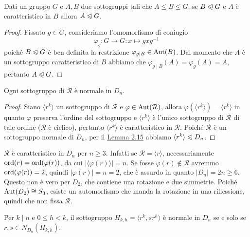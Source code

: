 \documentclass[11pt]{scrartcl}
\begin{document}
\begin{lemma}
    \label{lemma1.0}
    Dati un gruppo $G$ e $A, B$ due sottogruppi tali che $A \leqslant B \leqslant G$,
    se $B\trianglelefteqslant G$ e $A$ è caratteristico in $B$ allora 
    $A \trianglelefteqslant G$.
\end{lemma}

\begin{proof}
    Fissato $g \in G$, consideriamo l'omomorfismo di coniugio 
    \[
        \varphi_g : G\longrightarrow G : x\longmapsto gxg^{-1}
    \] poiché 
    $B\trianglelefteqslant G$ è ben definita la restrizione $\varphi_{g\mid B} \in \operatorname{Aut}(B)$. 
    Dal momento che $A$ è
    un sottogruppo caratteristico di $B$ abbiamo che $\varphi_{g\mid B}(A) =
    \varphi_g(A) = A$,
    pertanto $A \trianglelefteqslant G$.
\end{proof}


\begin{corollary}
    Ogni sottogruppo di $\mathcal{R}$ è normale in $D_n$.
\end{corollary}

\begin{proof}
    Siano $\langle r^k\rangle$ un sottogruppo di $\mathcal{R}$ e $\varphi
    \in \operatorname{Aut}(\mathcal{R})$, allora $\varphi(\langle r^k\rangle) = \langle r^k\rangle$
    in quanto $\varphi$ preserva l'ordine del sottogruppo e $\langle r^k\rangle$
    è l'unico sottogruppo di $\mathcal{R}$ di tale ordine ($\mathcal{R}$ è ciclico),
    pertanto $\langle r^k\rangle$
    è caratteristico in $\mathcal{R}$. Poiché $\mathcal{R}$ è un sottogruppo
    normale di $D_n$, per il \hyperref[lemma1.0]{Lemma 2.15}
    abbiamo $\langle r^k\rangle\trianglelefteqslant D_n$.
\end{proof}

\begin{remark}
    $\mathcal{R}$ è caratteristico in $D_n$ per $n \geqslant 3$.
    Infatti se $\mathcal{R} = \langle r \rangle$, necessariamente 
    $\operatorname{ord}(r) = \operatorname{ord}(\varphi(r))$, da cui $|\langle\varphi(r)\rangle| = n$.
    Se fosse $\varphi(r) \notin \mathcal{R}$ avremmo $\operatorname{ord}(\varphi(r)) = 2$, 
    quindi $|\varphi(r)| = n = 2$, che è assurdo in quanto $|D_n| = 2n \geqslant 6$.
    Questo non è vero per $D_2$, che contiene una rotazione e due
    simmetrie. Poiché $\operatorname{Aut}(D_2) \cong S_3$, esiste un automorfismo che manda 
    la rotazione in una riflessione, quindi che non fissa $\mathcal{R}$.
\end{remark}

\begin{corollary}
    Per $k\mid n$ e $0\leqslant h < k$, il sottogruppo $H_{k, h} = \langle r^k, sr^h\rangle$
    è normale in $D_n$ se e solo se $r, s \in N_{D_n}(H_{k, h})$.
\end{corollary}
\end{document}
